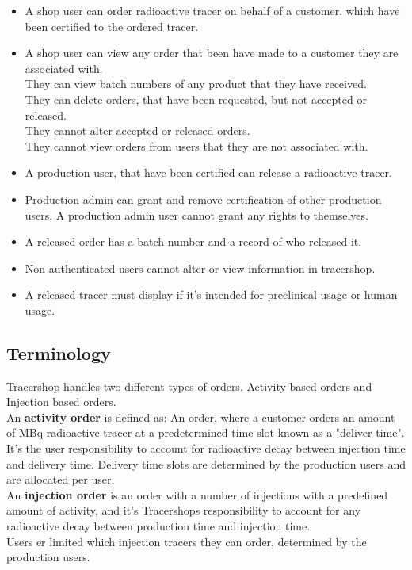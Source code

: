 \documentclass{article}
\begin{document}
\begin{itemize}
  \item A shop user can order radioactive tracer on behalf of a customer,
  which have been certified to the ordered tracer.
  \item A shop user can view any order that been have made to a customer they
  are associated with. \\
  They can view batch numbers of any product that they have received. \\
  They can delete orders, that have been requested, but not accepted or
  released.\\
  They cannot alter accepted or released orders.\\
  They cannot view orders from users that they are not associated with.
  \item A production user, that have been certified can release a radioactive
  tracer.
  \item Production admin can grant and remove certification of other production
  users. A production admin user cannot grant any rights to themselves.
  \item A released order has a batch number and a record of who released it.
  \item Non authenticated users cannot alter or view information in tracershop.
  \item A released tracer must display if it's intended for preclinical usage or
  human usage.
\end{itemize}

\subsection*{Terminology}

Tracershop handles two different types of orders. Activity based orders and
Injection based orders.\\
An \textbf{activity order} is defined as: An order, where a customer orders an
amount of MBq radioactive tracer at a predetermined time slot known as a
"deliver time".
It's the user responsibility to account for radioactive decay between injection
time and delivery time. Delivery time slots are determined by the production
users and are allocated per user.\\
An \textbf{injection order} is an order with a number of injections with a
predefined amount of activity, and it's Tracershops responsibility to account
for any radioactive decay between production time and injection time.\\
Users er limited which injection tracers they can order, determined by the
production users.
\end{document}
